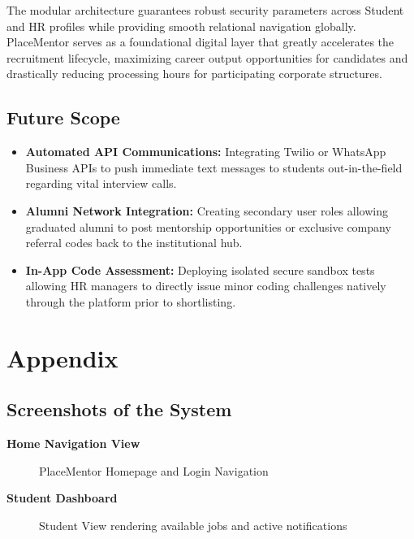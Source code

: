\documentclass[a4paper,12pt]{report}
\begin{document}
The modular architecture guarantees robust security parameters across Student and HR profiles while providing smooth relational navigation globally. PlaceMentor serves as a foundational digital layer that greatly accelerates the recruitment lifecycle, maximizing career output opportunities for candidates and drastically reducing processing hours for participating corporate structures.

\section{Future Scope}

\begin{itemize}
    \item \textbf{Automated API Communications:} Integrating Twilio or WhatsApp Business APIs to push immediate text messages to students out-in-the-field regarding vital interview calls.
    \item \textbf{Alumni Network Integration:} Creating secondary user roles allowing graduated alumni to post mentorship opportunities or exclusive company referral codes back to the institutional hub.
    \item \textbf{In-App Code Assessment:} Deploying isolated secure sandbox tests allowing HR managers to directly issue minor coding challenges natively through the platform prior to shortlisting.
\end{itemize}

\chapter*{Appendix}

\section*{Screenshots of the System}

\noindent\textbf{Home Navigation View}\\[0.3cm]
\begin{figure}[H]
    \centering
    \caption{PlaceMentor Homepage and Login Navigation}
    \label{fig:ss_home}
\end{figure}

\newpage
\noindent\textbf{Student Dashboard}\\[0.3cm]
\begin{figure}[H]
    \centering
    \caption{Student View rendering available jobs and active notifications}
    \label{fig:ss_student}
\end{figure}
\end{document}
